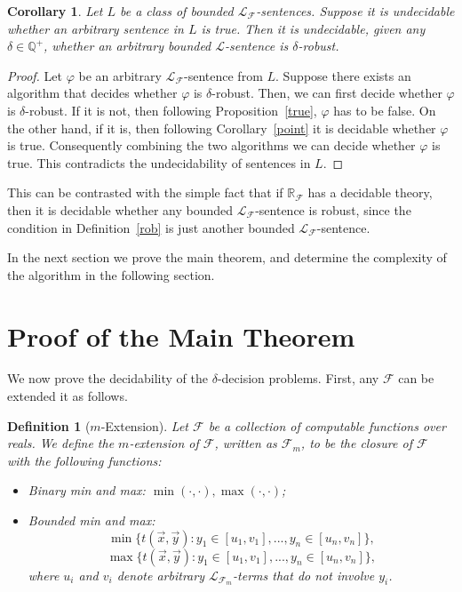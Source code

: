 \documentclass[conference]{IEEEtran}
\newtheorem{corollary}[theorem]{Corollary}
\newtheorem{definition}[theorem]{Definition}
\begin{document}
\begin{corollary}
Let $L$ be a class of bounded $\mathcal{L}_{\mathcal{F}}$-sentences. Suppose it is undecidable whether an arbitrary sentence in $L$ is true. Then it is undecidable, given any $\delta\in \mathbb{Q}^+$, whether an arbitrary bounded $\mathcal{L}$-sentence is $\delta$-robust. 
\end{corollary}
\begin{proof}
Let $\varphi$ be an arbitrary $\mathcal{L}_{\mathcal{F}}$-sentence from $L$. Suppose there exists an algorithm that decides whether $\varphi$ is $\delta$-robust. Then, we can first decide whether $\varphi$ is $\delta$-robust. If it is not, then following Proposition~\ref{true}, $\varphi$ has to be false. On the other hand, if it is, then following Corollary~\ref{point} it is decidable whether $\varphi$ is true. Consequently combining the two algorithms we can decide whether $\varphi$ is true. This contradicts the undecidability of sentences in $L$.
\end{proof}

This can be contrasted with the simple fact that if $\mathbb{R}_{\mathcal{F}}$ has a decidable theory, then it is decidable whether any bounded $\mathcal{L}_{\mathcal{F}}$-sentence is robust, since the condition in Definition~\ref{rob} is just another bounded $\mathcal{L}_{\mathcal{F}}$-sentence. 

In the next section we prove the main theorem, and determine the complexity of the algorithm in the following section. 

\section{Proof of the Main Theorem}\label{mainproof}

We now prove the decidability of the $\delta$-decision problems. First, any $\mathcal{F}$ can be extended it as follows. 
\begin{definition}[$m$-Extension] Let $\mathcal{F}$ be a collection of computable functions over reals. We define the $m$-extension of $\mathcal{F}$, written as $\mathcal{F}_m$, to be the closure of $\mathcal{F}$ with the following functions:
\begin{itemize}
\item Binary min and max: $\min(\cdot,\cdot), \max(\cdot,\cdot)$; 
\item Bounded min and max: 
$$\min\{t(\vec x, \vec y): y_1\in [u_1,v_1],...,y_n\in [u_n, v_n]\},$$
$$\max\{t(\vec x, \vec y): y_1\in [u_1,v_1],...,y_n\in [u_n, v_n]\},$$ 
where $u_i$ and $v_i$ denote arbitrary $\mathcal{L}_{\mathcal{F}_m}$-terms that do not involve $y_i$. 
\end{itemize}
\end{definition}
\end{document}

